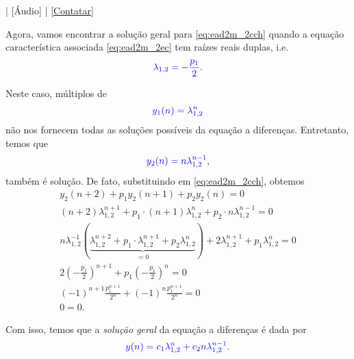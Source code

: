 \begin{flushright}
  [Vídeo] | [Áudio] | \href{https://phkonzen.github.io/notas/contato.html}{[Contatar]}
\end{flushright}

Agora, vamos encontrar a solução geral para \eqref{eq:ead2m_2cch} quando a equação característica associada \eqref{eq:ead2m_2ec} tem raízes reais duplas, i.e.
\begin{equation}
  {\color{blue}\lambda_{1,2} = -\frac{p_1}{2}}.
\end{equation}

Neste caso, múltiplos de
\begin{equation}
  {\color{blue}y_1(n) = \lambda^n_{1,2}}
\end{equation}
não nos fornecem todas as soluções possíveis da equação a diferenças. Entretanto, temos que
\begin{equation}
  {\color{blue}y_2(n) = n\lambda_{1,2}^{n-1}},
\end{equation}
também é solução. De fato, substituindo em \eqref{eq:ead2m_2cch}, obtemos
\begin{gather}
  y_2(n+2) + p_1y_2(n+1) + p_2y_2(n) = 0\\
  (n+2)\lambda_{1,2}^{n+1} + p_1\cdot(n+1)\lambda_{1,2}^n + p_2\cdot n\lambda_{1,2}^{n-1} = 0\\
  n\lambda_{1,2}^{-1}\left(\underbrace{\lambda_{1,2}^{n+2}+p_1\cdot\lambda_{1,2}^{n+1}+p_2\lambda_{1,2}^n}_{=0}\right) + 2\lambda_{1,2}^{n+1}+p_1\lambda_{1,2}^n = 0\\
  2\left(-\frac{p_1}{2}\right)^{n+1}+p_1\left(-\frac{p_1}{2}\right)^n = 0\\
  (-1)^{n+1}\frac{p_1^{n+1}}{2^n} + (-1)^n\frac{p_1^{n+1}}{2^n} = 0\\
  0 = 0.
\end{gather}

Com isso, temos que a \emph{solução geral} da equação a diferenças é dada por
\begin{equation}
  {\color{blue}y(n) = c_1\lambda_{1,2}^n + c_2n\lambda_{1,2}^{n-1}}.
\end{equation}

